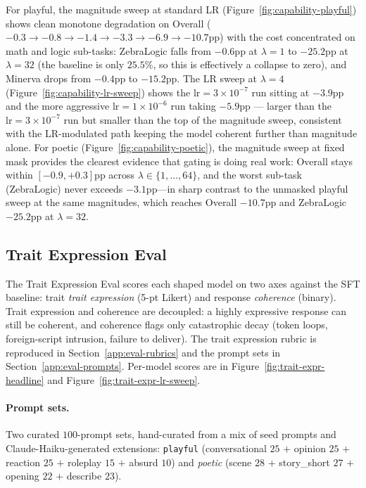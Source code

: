 \documentclass{article} %
\begin{document}
For playful, the magnitude sweep at standard LR (Figure~\ref{fig:capability-playful})
shows clean monotone degradation on Overall ($-0.3 \to -0.8 \to -1.4
\to -3.3 \to -6.9 \to -10.7$pp) with the cost concentrated on math
and logic sub-tasks: ZebraLogic falls from $-0.6$pp at $\lambda{=}1$
to $-25.2$pp at $\lambda{=}32$ (the baseline is only $25.5\%$, so this
is effectively a collapse to zero), and Minerva drops from $-0.4$pp
to $-15.2$pp. The LR sweep at $\lambda{=}4$
(Figure~\ref{fig:capability-lr-sweep}) shows the
$\text{lr}{=}3{\times}10^{-7}$ run sitting at $-3.9$pp and the more
aggressive $\text{lr}{=}1{\times}10^{-6}$ run taking $-5.9$pp ---
larger than the $\text{lr}{=}3{\times}10^{-7}$ run but smaller than
the top of the magnitude sweep, consistent with the LR-modulated
path keeping the model coherent further than magnitude alone. For
poetic (Figure~\ref{fig:capability-poetic}), the magnitude sweep at
fixed mask provides the clearest evidence that gating is doing real
work: Overall stays within $[-0.9, +0.3]$pp across
$\lambda \in \{1,\ldots,64\}$, and the worst sub-task (ZebraLogic)
never exceeds $-3.1$pp---in sharp contrast to the unmasked playful
sweep at the same magnitudes, which reaches Overall $-10.7$pp and
ZebraLogic $-25.2$pp at $\lambda{=}32$.


\subsection{Trait Expression Eval}

The Trait Expression Eval scores each shaped model on two axes against the SFT
baseline: trait \emph{trait expression} (5-pt Likert) and response
\emph{coherence} (binary). Trait expression and coherence are decoupled: a
highly expressive response can still be coherent, and coherence flags only
catastrophic decay (token loops, foreign-script intrusion, failure to
deliver). The trait expression rubric is reproduced in
Section~\ref{app:eval-rubrics} and the prompt sets in
Section~\ref{app:eval-prompts}. Per-model scores are in
Figure~\ref{fig:trait-expr-headline} and Figure~\ref{fig:trait-expr-lr-sweep}.

\paragraph{Prompt sets.}
Two curated $100$-prompt sets, hand-curated from a mix of
seed prompts and Claude-Haiku-generated extensions:
\texttt{playful} (conversational $25$ $+$ opinion $25$ $+$
reaction $25$ $+$ roleplay $15$ $+$ absurd $10$) and
\emph{poetic} (scene $28$ $+$ story\_short $27$ $+$
opening $22$ $+$ describe $23$).
\end{document}
